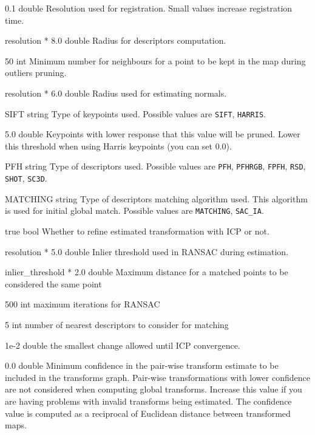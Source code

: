 {0.1}
{double}
{Resolution used for registration. Small values increase registration time.}

{resolution * 8.0}
{double}
{Radius for descriptors computation.}

{50}
{int}
{Minimum number for neighbours for a point to be kept in the map during outliers pruning.}

{resolution * 6.0}
{double}
{Radius used for estimating normals.}

{SIFT}
{string}
{Type of keypoints used. Possible values are \texttt{SIFT}, \texttt{HARRIS}.}

{5.0}
{double}
{Keypoints with lower response that this value will be pruned. Lower this threshold when using Harris keypoints (you can set $0.0$).}

{PFH}
{string}
{Type of descriptors used. Possible values are \texttt{PFH}, \texttt{PFHRGB}, \texttt{FPFH}, \texttt{RSD}, \texttt{SHOT}, \texttt{SC3D}.}

{MATCHING}
{string}
{Type of descriptors matching algorithm used. This algorithm is used for initial global match. Possible values are \texttt{MATCHING}, \texttt{SAC\_IA}.}

{true}
{bool}
{Whether to refine estimated transformation with \gls{ICP} or not.}

{resolution * 5.0}
{double}
{Inlier threshold used in \gls{RANSAC} during estimation.}

{inlier\_threshold * 2.0}
{double}
{Maximum distance for a matched points to be considered the same point}

{500}
{int}
{maximum iterations for \gls{RANSAC}}

{5}
{int}
{number of nearest descriptors to consider for matching}

{1e-2}
{double}
{the smallest change allowed until \gls{ICP} convergence.}

{0.0}
{double}
{Minimum confidence in the pair-wise transform estimate to be included in the transforms graph. Pair-wise transformations with lower confidence are not considered when computing global transforms. Increase this value if you are having problems with invalid transforms being estimated. The confidence value is computed as a reciprocal of Euclidean distance between transformed maps.}

